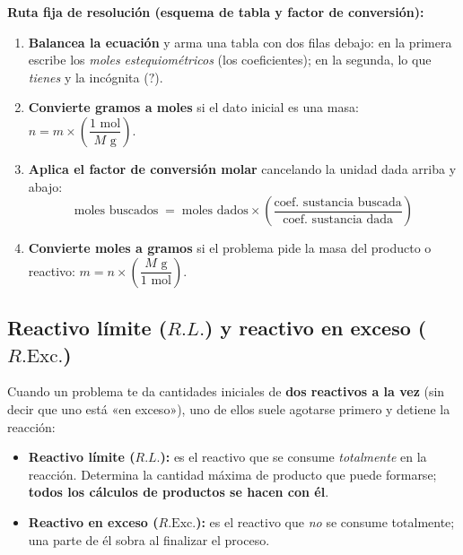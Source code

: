 \documentclass[12pt, letterpaper]{article}
\begin{document}
\begin{cuadropasos}[nobreak=true]
  \textbf{Ruta fija de resolución (esquema de tabla y factor de conversión):}
  \begin{enumerate}[leftmargin=*, nosep, topsep=3pt]
    \item \textbf{Balancea la ecuación} y arma una tabla con dos filas debajo: en la primera escribe los \emph{moles estequiométricos} (los coeficientes); en la segunda, lo que \emph{tienes} y la incógnita ($?$).
    \item \textbf{Convierte gramos a moles} si el dato inicial es una masa:
          $n = m \times \left(\dfrac{1\text{ mol}}{M\text{ g}}\right)$.
    \item \textbf{Aplica el factor de conversión molar} cancelando la unidad dada arriba y abajo:
          \[
            \text{moles buscados} \;=\; \text{moles dados} \times \left(\frac{\text{coef. sustancia buscada}}{\text{coef. sustancia dada}}\right)
          \]
    \item \textbf{Convierte moles a gramos} si el problema pide la masa del producto o reactivo:
          $m = n \times \left(\dfrac{M\text{ g}}{1\text{ mol}}\right)$.
  \end{enumerate}
\end{cuadropasos}

\subsection{Reactivo límite ($R.L.$) y reactivo en exceso ($R.\text{Exc.}$)}

\begin{cuadroteoria}[nobreak=true]
  Cuando un problema te da cantidades iniciales de \textbf{dos reactivos a la vez} (sin decir que uno está «en exceso»), uno de ellos suele agotarse primero y detiene la reacción:
  \begin{itemize}[leftmargin=*, nosep, topsep=3pt]
    \item \textbf{Reactivo límite ($R.L.$):} es el reactivo que se consume \emph{totalmente} en la reacción. Determina la cantidad máxima de producto que puede formarse; \textbf{todos los cálculos de productos se hacen con él}.
    \item \textbf{Reactivo en exceso ($R.\text{Exc.}$):} es el reactivo que \emph{no} se consume totalmente; una parte de él sobra al finalizar el proceso.
  \end{itemize}
\end{cuadroteoria}
\end{document}
